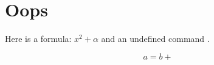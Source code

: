 \documentclass{article}
\begin{document}
\section{Oops}
Here is a formula: $x^2 + \alpha$ and an undefined command .

\begin{equation}
  a = b +
\end{equation}
\end{document}
